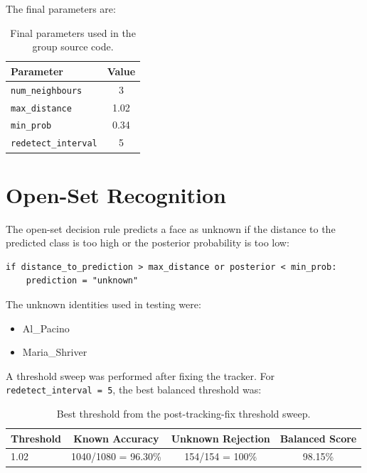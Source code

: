 \documentclass[11pt,a4paper]{article}
\begin{document}
The final parameters are:

\begin{table}[h]
\centering
\begin{tabular}{lc}
\toprule
\textbf{Parameter} & \textbf{Value} \\
\midrule
\texttt{num\_neighbours} & 3 \\
\texttt{max\_distance} & 1.02 \\
\texttt{min\_prob} & 0.34 \\
\texttt{redetect\_interval} & 5 \\
\bottomrule
\end{tabular}
\caption{Final parameters used in the group source code.}
\end{table}

\section{Open-Set Recognition}

The open-set decision rule predicts a face as unknown if the distance to the predicted class is too high or the posterior probability is too low:

\begin{lstlisting}
if distance_to_prediction > max_distance or posterior < min_prob:
    prediction = "unknown"
\end{lstlisting}

The unknown identities used in testing were:

\begin{itemize}[noitemsep]
    \item Al\_Pacino
    \item Maria\_Shriver
\end{itemize}

A threshold sweep was performed after fixing the tracker. For \texttt{redetect\_interval = 5}, the best balanced threshold was:

\begin{table}[h]
\centering
\begin{tabular}{lccc}
\toprule
\textbf{Threshold} & \textbf{Known Accuracy} & \textbf{Unknown Rejection} & \textbf{Balanced Score} \\
\midrule
1.02 & 1040/1080 = 96.30\% & 154/154 = 100\% & 98.15\% \\
\bottomrule
\end{tabular}
\caption{Best threshold from the post-tracking-fix threshold sweep.}
\end{table}
\end{document}
